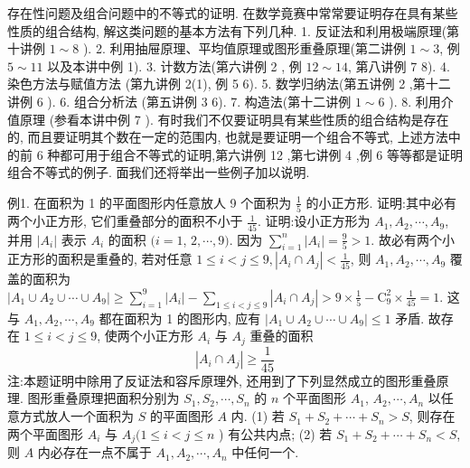 
存在性问题及组合问题中的不等式的证明.
在数学竟赛中常常要证明存在具有某些性质的组合结构, 解这类问题的基本方法有下列几种.
1. 反证法和利用极端原理(第十讲例 $1 \sim 8$ ).
2. 利用抽屉原理、平均值原理或图形重叠原理(第二讲例 $1 \sim 3$, 例 $5 \sim 11$ 以及本讲中例 1).
3. 计数方法(第六讲例 2 , 例 $12 \sim 14$, 第八讲例 7 8).
4. 染色方法与赋值方法 (第九讲例 2(1), 例 5 6).
5. 数学归纳法(第五讲例 2 ,第十二讲例 6 ).
6. 组合分析法 (第五讲例 3 6).
7. 构造法(第十二讲例 $1 \sim 6$ ).
8. 利用介值原理 (参看本讲中例 7 ).
有时我们不仅要证明具有某些性质的组合结构是存在的, 而且要证明其个数在一定的范围内, 也就是要证明一个组合不等式, 上述方法中的前 6 种都可用于组合不等式的证明,第六讲例 12 ,第七讲例 4 ,例 6 等等都是证明组合不等式的例子.
面我们还将举出一些例子加以说明.



例1. 在面积为 1 的平面图形内任意放人 9 个面积为 $\frac{1}{5}$ 的小正方形.
证明:其中必有两个小正方形, 它们重叠部分的面积不小于 $\frac{1}{45}$.
证明:设小正方形为 $A_1, A_2, \cdots, A_9$, 并用 $\left|A_i\right|$ 表示 $A_i$ 的面积 $(i=1$, $2, \cdots, 9)$. 因为 $\sum_{i=1}^n\left|A_i\right|=\frac{9}{5}>1$. 故必有两个小正方形的面积是重叠的, 若对任意 $1 \leqslant i<j \leqslant 9,\left|A_i \cap A_j\right|<\frac{1}{45}$, 则 $A_1, A_2, \cdots, A_9$ 覆盖的面积为 $\left|A_1 \cup A_2 \cup \cdots \cup A_9\right| \geqslant \sum_{i=1}^9\left|A_i\right|-\sum_{1 \leqslant i<j \leqslant 9}\left|A_i \cap A_j\right|>9 \times \frac{1}{5}-\mathrm{C}_9^2 \times \frac{1}{45}=1$. 这与 $A_1, A_2, \cdots, A_9$ 都在面积为 1 的图形内, 应有 $\left|A_1 \cup A_2 \cup \cdots \cup A_9\right| \leqslant 1$ 矛盾.
故存在 $1 \leqslant i<j \leqslant 9$, 使两个小正方形 $A_i$ 与 $A_j$ 重叠的面积
$$
\left|A_i \cap A_j\right| \geqslant \frac{1}{45}
$$
注:本题证明中除用了反证法和容斥原理外, 还用到了下列显然成立的图形重叠原理.
图形重叠原理把面积分别为 $S_1, S_2, \cdots, S_n$ 的 $n$ 个平面图形 $A_1$, $A_2, \cdots, A_n$ 以任意方式放人一个面积为 $S$ 的平面图形 $A$ 内.
(1) 若 $S_1+S_2+\cdots+S_n>S$, 则存在两个平面图形 $A_i$ 与 $A_j(1 \leqslant i< j \leqslant n$ ) 有公共内点;
(2) 若 $S_1+S_2+\cdots+S_n<S$, 则 $A$ 内必存在一点不属于 $A_1, A_2, \cdots, A_n$ 中任何一个.



